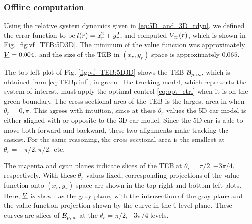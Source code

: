 \subsubsection{Offline computation}

Using the relative system dynamics given in \eqref{eq:5D_and_3D_rdyn}, we defined the error function to be $l(r) = x_r^2 + y_r^2$, and computed $V_\infty(r)$, which is shown in Fig. \ref{fig:vf_TEB:5D3D}.
The minimum of the value function was approximately $\underline{V} = 0.004$, and the size of the TEB in $(x_r, y_r)$ space is approximately $0.065$.

The top left plot of Fig. \ref{fig:vf_TEB:5D3D} shows the TEB $\mathcal B_{p, \infty}$, which is obtained from \eqref{eq:TEBp:inf}, in green.
The tracking model, which represents the system of interest, must apply the optimal control \eqref{eq:opt_ctrl} when it is on the green boundary.
The cross sectional area of the TEB is the largest area in when $\theta_r = 0,\pi$. 
This agrees with intuition, since at these $\theta_r$ values the 5D car model is either aligned with or opposite to the 3D car model.
Since the 5D car is able to move both forward and backward, these two alignments make tracking the easiest.
For the same reasoning, the cross sectional area is the smallest at $\theta_r = -\pi/2, \pi/2,$ etc.

The magenta and cyan planes indicate slices of the TEB at $\theta_r = \pi/2, -3\pi/4$, respectively.
With these $\theta_r$ values fixed, corresponding projections of the value function onto $(x_r, y_r)$ space are shown in the top right and bottom left plots.
Here, $\underline{V}$ is shown as the gray plane, with the intersection of the gray plane and the value function projection shown by the curve in the $0$-level plane. 
These curves are slices of $\mathcal B_{p, \infty}$ at the $\theta_r = \pi/2, -3\pi/4$ levels.

